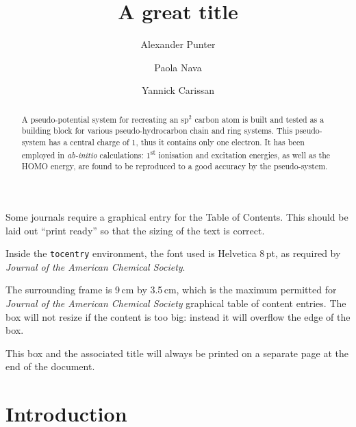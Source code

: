 \documentclass[journal=jctcce,manuscript=article]{achemso}
\author{Alexander Punter}
\author{Paola Nava}
\author{Yannick Carissan}
\affiliation[Aix-Marseille University]
{Aix Marseille Univ, CNRS, Centrale Marseille, iSm2, Marseille, France}
\title[A great title]
  {A great title}
\begin{document}
\begin{tocentry}

Some journals require a graphical entry for the Table of Contents.
This should be laid out ``print ready'' so that the sizing of the
text is correct.

Inside the \texttt{tocentry} environment, the font used is Helvetica
8\,pt, as required by \emph{Journal of the American Chemical
Society}.

The surrounding frame is 9\,cm by 3.5\,cm, which is the maximum
permitted for  \emph{Journal of the American Chemical Society}
graphical table of content entries. The box will not resize if the
content is too big: instead it will overflow the edge of the box.

This box and the associated title will always be printed on a
separate page at the end of the document.

\end{tocentry}

\begin{abstract}
A pseudo-potential system for recreating an sp\(^{2}\) carbon atom is built 
and tested as a building block for various pseudo-hydrocarbon chain and ring systems.  
This pseudo-system has a central charge of 1, thus it contains only one
electron. It has been employed in \textsl{ab-initio} calculations:
1\textsuperscript{st} ionisation and excitation energies, as well as the HOMO energy, 
are found to be reproduced to a good accuracy by the pseudo-system.
\end{abstract}

\section{Introduction}
\end{document}

